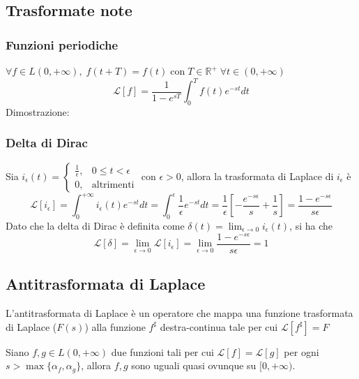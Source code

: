         \subsection{Trasformate note}
            \subsubsection{Funzioni periodiche}
                $\forall f \in L(0, +\infty), \; f(t + T) = f(t) \; \text{con} \; T \in \mathbb{R^{+}} \; \forall t \in (0, +\infty)$
                \[
                    \mathcal{L}[f] = \frac{1}{1 - e^{sT}} \int_{0}^{T} f(t) e^{-st} dt
                \]
                Dimostrazione:
                \[
                \]

            \subsubsection{Delta di Dirac}
                Sia $i_{\epsilon}(t) = \begin{cases} \frac{1}{\epsilon}, & 0 \leq t < \epsilon \\ 0, & \text{altrimenti} \end{cases}$ con $\epsilon > 0$, allora la trasformata di Laplace di $i_{\epsilon}$ è
                \[
                    \mathcal{L}[i_{\epsilon}] = \int_{0}^{+\infty} i_{\epsilon}(t) e^{-st} dt = \int_{0}^{\epsilon} \frac{1}{\epsilon} e^{-st} dt = \frac{1}{\epsilon} \left[ -\frac{e^{-s\epsilon}}{s} + \frac{1}{s} \right] = \frac{1 - e^{-s\epsilon}}{s\epsilon}
                \]
                Dato che la delta di Dirac è definita come $\displaystyle \delta(t) = \lim_{\epsilon \rightarrow 0} i_{\epsilon}(t)$, si ha che
                \[
                    \mathcal{L}[\delta] = \lim_{\epsilon \rightarrow 0} \mathcal{L}[i_{\epsilon}] = \lim_{\epsilon \rightarrow 0} \frac{1 - e^{-s\epsilon}}{s\epsilon} = 1
                \]
        \subsection{Antitrasformata di Laplace}
            L'antitrasformata di Laplace è un operatore che mappa una funzione trasformata di Laplace ($F(s)$) alla funzione $f^{\sharp}$ destra-continua
            tale per cui $\mathcal{L}[f^{\sharp}] = F$

            \begin{theorem}
                Siano $f, g \in L(0, +\infty)$ due funzioni tali per cui $\mathcal{L}[f] = \mathcal{L}[g]$ per ogni $s > \max\{\alpha_f, \alpha_g\}$, allora $f, g$ sono uguali quasi ovunque su $[0, +\infty)$.
            \end{theorem}

